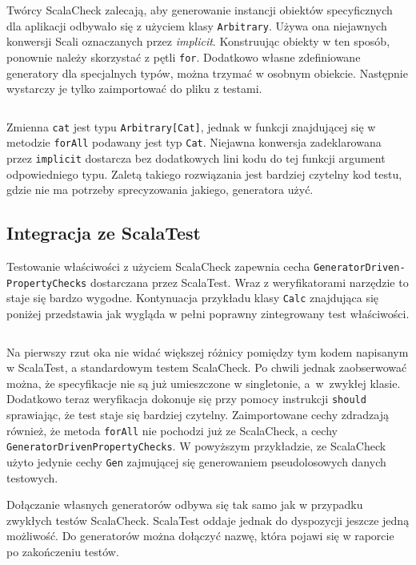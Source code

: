 \documentclass[wimgr]{xmgr}
\begin{document}
Twórcy ScalaCheck zalecają, aby generowanie instancji obiektów specyficznych dla aplikacji odbywało się z użyciem klasy \texttt{Arbitrary}. Używa ona niejawnych konwersji Scali oznaczanych przez \emph{implicit}. Konstruując obiekty w ten sposób, ponownie należy skorzystać z pętli \texttt{for}. Dodatkowo własne zdefiniowane generatory dla specjalnych typów, można trzymać w osobnym obiekcie. Następnie wystarczy je tylko zaimportować do pliku z testami.

\inputminted[fontsize=\small]{scala}{code/CatTestArbitrary.scala}

Zmienna \texttt{cat} jest typu \texttt{Arbitrary[Cat]}, jednak w funkcji znajdującej się w metodzie \texttt{forAll} podawany jest typ \texttt{Cat}. Niejawna konwersja zadeklarowana przez \texttt{implicit} dostarcza bez dodatkowych lini kodu do tej funkcji argument odpowiedniego typu. Zaletą takiego rozwiązania jest bardziej czytelny kod testu, gdzie nie ma potrzeby sprecyzowania jakiego, generatora użyć.

\subsection{Integracja ze ScalaTest}

Testowanie właściwości z użyciem ScalaCheck zapewnia cecha \texttt{GeneratorDriven-\newline PropertyChecks} dostarczana przez ScalaTest. Wraz z weryfikatorami narzędzie to staje się bardzo wygodne. Kontynuacja przykładu klasy \texttt{Calc} znajdująca się poniżej przedstawia jak wygląda w pełni poprawny zintegrowany test właściwości. 

\inputminted[fontsize=\small]{scala}{code/CalcTestScalaTest.scala}

Na pierwszy rzut oka nie widać większej różnicy pomiędzy tym kodem napisanym w ScalaTest, a standardowym testem ScalaCheck. Po chwili jednak zaobserwować można, że specyfikacje nie są już umieszczone w singletonie, a~w~zwykłej klasie. Dodatkowo teraz weryfikacja dokonuje się przy pomocy instrukcji \texttt{should} sprawiając, że test staje się bardziej czytelny. Zaimportowane cechy zdradzają również, że metoda \texttt{forAll} nie pochodzi już ze ScalaCheck, a cechy \texttt{GeneratorDrivenPropertyChecks}. W powyższym przykładzie, ze ScalaCheck użyto jedynie cechy \texttt{Gen} zajmującej się generowaniem pseudolosowych danych testowych.

Dołączanie własnych generatorów odbywa się tak samo jak w przypadku zwykłych testów ScalaCheck. ScalaTest oddaje jednak do dyspozycji jeszcze jedną możliwość. Do generatorów można dołączyć nazwę, która pojawi się w raporcie po zakończeniu testów.
\end{document}
